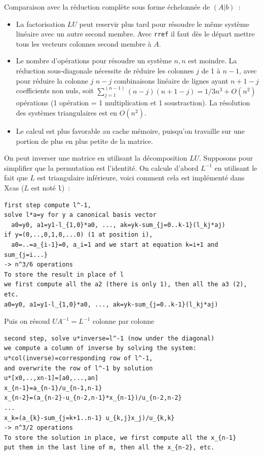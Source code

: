 \documentclass[a4paper,11pt]{article}
\begin{document}
\begin{giacjshere}
Comparaison avec la r\'eduction compl\`ete sous forme \'echelonn\'ee de
$(A|b)$~:
\begin{itemize}
\item La factorisation $LU$ peut reservir plus tard pour r\'esoudre le m\^eme
syst\`eme lin\'eaire avec un autre second membre.
Avec \verb|rref| il faut d\`es le d\'epart mettre tous les
vecteurs colonnes second membre \`a $A$.
\item Le nombre d'op\'erations pour r\'esoudre un syst\`eme $n,n$
est moindre. La r\'eduction sous-diagonale n\'ecessite de r\'eduire
les colonnes $j$ de 1 \`a $n-1$, avec pour r\'eduire la colonne $j$
$n-j$ combinaisons lin\'eaire de lignes ayant $n+1-j$ coefficients non
nuls, soit $\sum_{j=1}^(n-1) (n-j)(n+1-j)=1/3n^3+O(n^2)$ op\'erations
(1 op\'eration = 1 multiplication et 1 soustraction).
La r\'esolution des syst\`emes triangulaires est en $O(n^2)$.
\item Le calcul est plus favorable au cache m\'emoire, puisqu'on
  travaille sur une portion de plus en plus petite de la matrice.
\end{itemize}

On peut inverser une matrice en utilisant la d\'ecomposition
$LU$. Supposons pour simplifier que la permutation est l'identit\'e.
On calcule d'abord $L^{-1}$ en utilisant le fait que $L$ est
triangulaire inf\'erieure, voici comment cela est impl\'ement\'e dans
Xcas ($L$ est not\'e {\tt l})~:
\begin{verbatim}
first step compute l^-1, 
solve l*a=y for y a canonical basis vector
  a0=y0, a1=y1-l_{1,0}*a0, ..., ak=yk-sum_{j=0..k-1}(l_kj*aj)
if y=(0,..,0,1,0,...0) (1 at position i), 
  a0=..=a_{i-1}=0, a_i=1 and we start at equation k=i+1 and sum_{j=i...}
-> n^3/6 operations
To store the result in place of l
we first compute all the a2 (there is only 1), then all the a3 (2), etc.
a0=y0, a1=y1-l_{1,0}*a0, ..., ak=yk-sum_{j=0..k-1}(l_kj*aj)
\end{verbatim}
Puis on r\'esoud $U A^{-1}=L^{-1}$ colonne par colonne
\begin{verbatim}
second step, solve u*inverse=l^-1 (now under the diagonal)
we compute a column of inverse by solving the system: 
u*col(inverse)=corresponding row of l^-1, 
and overwrite the row of l^-1 by solution
u*[x0,..,xn-1]=[a0,...,an]
x_{n-1}=a_{n-1}/u_{n-1,n-1}
x_{n-2}=(a_{n-2}-u_{n-2,n-1}*x_{n-1})/u_{n-2,n-2}
...
x_k=(a_{k}-sum_{j=k+1..n-1} u_{k,j}x_j)/u_{k,k}
-> n^3/2 operations
To store the solution in place, we first compute all the x_{n-1}
put them in the last line of m, then all the x_{n-2}, etc.
\end{verbatim}


\end{giacjshere}
\end{document}

